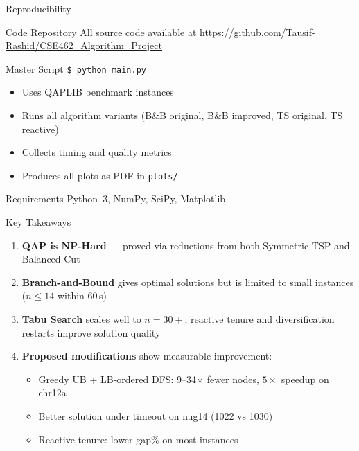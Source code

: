 \documentclass[aspectratio=169,11pt]{beamer}
\begin{document}
\begin{frame}{Reproducibility}
\begin{block}{Code Repository}
All source code available at \url{https://github.com/Tausif-Rashid/CSE462_Algorithm_Project}
\end{block}
\vspace{6pt}
\begin{block}{Master Script}
\texttt{\$ python main.py}
\begin{itemize}
  \item Uses QAPLIB benchmark instances
  \item Runs all algorithm variants (B\&B original, B\&B improved, TS original, TS reactive)
  \item Collects timing and quality metrics
  \item Produces all plots as PDF in \texttt{plots/}
\end{itemize}
\end{block}
\vspace{4pt}
\begin{block}{Requirements}
Python~3, NumPy, SciPy, Matplotlib
\end{block}
\end{frame}

\begin{frame}{Key Takeaways}
\begin{enumerate}\setlength\itemsep{10pt}
  \item \textbf{QAP is NP-Hard} --- proved via reductions from both
        \alert{Symmetric TSP} and \alert{Balanced Cut}

  \item \textbf{Branch-and-Bound} gives \alert{optimal} solutions
        but is limited to small instances ($n\le 14$ within 60\,s)

  \item \textbf{Tabu Search} scales well to $n=30+$;
        \alert{reactive tenure} and \alert{diversification restarts}
        improve solution quality

  \item \textbf{Proposed modifications} show measurable improvement:
        \begin{itemize}
          \item Greedy UB + LB-ordered DFS: 9--34$\times$ fewer nodes, $5\times$ speedup on chr12a
          \item Better solution under timeout on nug14 (1022 vs 1030)
          \item Reactive tenure: lower gap\% on most instances
        \end{itemize}
\end{enumerate}
\end{frame}
\end{document}
